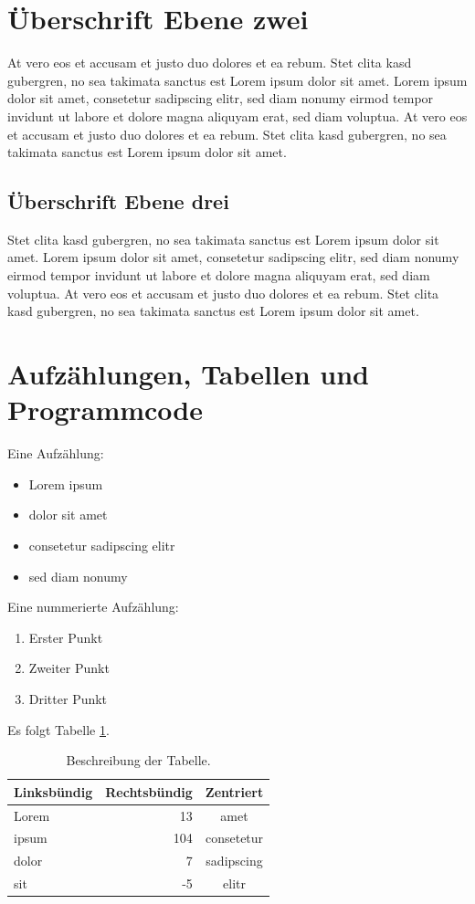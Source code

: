 \documentclass[a4paper, 11pt, toc=listof, toc=bib]{scrbook}
\begin{document}
\section{Überschrift Ebene zwei}

At vero eos et accusam et justo duo dolores et ea rebum. Stet clita kasd gubergren, no sea takimata sanctus est Lorem ipsum dolor sit amet. Lorem ipsum dolor sit amet, consetetur sadipscing elitr, sed diam nonumy eirmod tempor invidunt ut labore et dolore magna aliquyam erat, sed diam voluptua. At vero eos et accusam et justo duo dolores et ea rebum. Stet clita kasd gubergren, no sea takimata sanctus est Lorem ipsum dolor sit amet.

\subsection{Überschrift Ebene drei}

Stet clita kasd gubergren, no sea takimata sanctus est Lorem ipsum dolor sit amet. Lorem ipsum dolor sit amet, consetetur sadipscing elitr, sed diam nonumy eirmod tempor invidunt ut labore et dolore magna aliquyam erat, sed diam voluptua. At vero eos et accusam et justo duo dolores et ea rebum. Stet clita kasd gubergren, no sea takimata sanctus est Lorem ipsum dolor sit amet.

\section{Aufzählungen, Tabellen und Programmcode}

Eine Aufzählung:

\begin{itemize}
\item Lorem ipsum
\item dolor sit amet
\item consetetur sadipscing elitr
\item sed diam nonumy
\end{itemize}
Eine nummerierte Aufzählung:

\begin{enumerate}
\item Erster Punkt
\item Zweiter Punkt
\item Dritter Punkt
\end{enumerate}
Es folgt Tabelle \ref{beispieltabelle}.

\begin{table}[htbp]
\centering
\begin{tabular}{lrc}
\toprule
Linksbündig & Rechtsbündig & Zentriert \\
\midrule
Lorem &  13 & amet \\
ipsum & 104 & consetetur \\
dolor &   7 & sadipscing \\
sit   &  -5 & elitr \\
\bottomrule
\end{tabular}
\caption{Beschreibung der Tabelle.}
\label{beispieltabelle}
\end{table}
\end{document}
